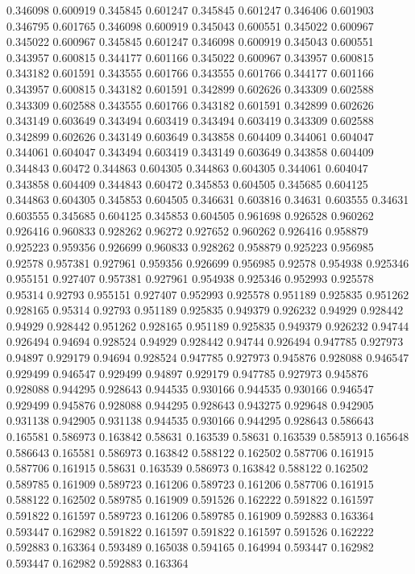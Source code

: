 0.346098 0.600919
0.345845 0.601247
0.345845 0.601247
0.346406 0.601903
0.346795 0.601765
0.346098 0.600919
0.345043 0.600551
0.345022 0.600967
0.345022 0.600967
0.345845 0.601247
0.346098 0.600919
0.345043 0.600551
0.343957 0.600815
0.344177 0.601166
0.345022 0.600967
0.343957 0.600815
0.343182 0.601591
0.343555 0.601766
0.343555 0.601766
0.344177 0.601166
0.343957 0.600815
0.343182 0.601591
0.342899 0.602626
0.343309 0.602588
0.343309 0.602588
0.343555 0.601766
0.343182 0.601591
0.342899 0.602626
0.343149 0.603649
0.343494 0.603419
0.343494 0.603419
0.343309 0.602588
0.342899 0.602626
0.343149 0.603649
0.343858 0.604409
0.344061 0.604047
0.344061 0.604047
0.343494 0.603419
0.343149 0.603649
0.343858 0.604409
0.344843 0.60472
0.344863 0.604305
0.344863 0.604305
0.344061 0.604047
0.343858 0.604409
0.344843 0.60472
0.345853 0.604505
0.345685 0.604125
0.344863 0.604305
0.345853 0.604505
0.346631 0.603816
0.34631 0.603555
0.34631 0.603555
0.345685 0.604125
0.345853 0.604505
0.961698 0.926528
0.960262 0.926416
0.960833 0.928262
0.96272 0.927652
0.960262 0.926416
0.958879 0.925223
0.959356 0.926699
0.960833 0.928262
0.958879 0.925223
0.956985 0.92578
0.957381 0.927961
0.959356 0.926699
0.956985 0.92578
0.954938 0.925346
0.955151 0.927407
0.957381 0.927961
0.954938 0.925346
0.952993 0.925578
0.95314 0.92793
0.955151 0.927407
0.952993 0.925578
0.951189 0.925835
0.951262 0.928165
0.95314 0.92793
0.951189 0.925835
0.949379 0.926232
0.94929 0.928442
0.94929 0.928442
0.951262 0.928165
0.951189 0.925835
0.949379 0.926232
0.94744 0.926494
0.94694 0.928524
0.94929 0.928442
0.94744 0.926494
0.947785 0.927973
0.94897 0.929179
0.94694 0.928524
0.947785 0.927973
0.945876 0.928088
0.946547 0.929499
0.946547 0.929499
0.94897 0.929179
0.947785 0.927973
0.945876 0.928088
0.944295 0.928643
0.944535 0.930166
0.944535 0.930166
0.946547 0.929499
0.945876 0.928088
0.944295 0.928643
0.943275 0.929648
0.942905 0.931138
0.942905 0.931138
0.944535 0.930166
0.944295 0.928643
0.586643 0.165581
0.586973 0.163842
0.58631 0.163539
0.58631 0.163539
0.585913 0.165648
0.586643 0.165581
0.586973 0.163842
0.588122 0.162502
0.587706 0.161915
0.587706 0.161915
0.58631 0.163539
0.586973 0.163842
0.588122 0.162502
0.589785 0.161909
0.589723 0.161206
0.589723 0.161206
0.587706 0.161915
0.588122 0.162502
0.589785 0.161909
0.591526 0.162222
0.591822 0.161597
0.591822 0.161597
0.589723 0.161206
0.589785 0.161909
0.592883 0.163364
0.593447 0.162982
0.591822 0.161597
0.591822 0.161597
0.591526 0.162222
0.592883 0.163364
0.593489 0.165038
0.594165 0.164994
0.593447 0.162982
0.593447 0.162982
0.592883 0.163364
